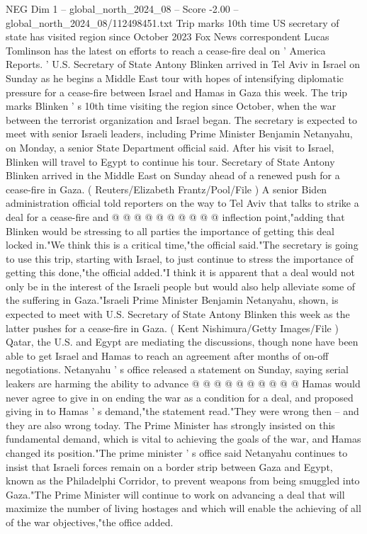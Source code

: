 \begin{textsample}{NEG Dim 1 – global\_north\_2024\_08 – Score -2.00 – global\_north\_2024\_08/112498451.txt}  \label{ex:f1_neg_039}
Trip marks 10th time US secretary of state has visited region since October 2023 Fox News correspondent Lucas Tomlinson has the latest on efforts to reach a cease-fire deal on ' America Reports. ' U.S.
Secretary of State Antony Blinken arrived in Tel Aviv in Israel on Sunday as he begins a Middle East tour with hopes of intensifying diplomatic pressure for a cease-fire between Israel and Hamas in Gaza this week.
The trip marks Blinken ' s 10th time visiting the region since October, when the war between the terrorist organization and Israel began.
The secretary is expected to meet with senior Israeli leaders, including Prime Minister Benjamin Netanyahu, on Monday, a senior State Department official said.
After his visit to Israel, Blinken will travel to Egypt to continue his tour.
Secretary of State Antony Blinken arrived in the Middle East on Sunday ahead of a renewed push for a cease-fire in Gaza. ( Reuters/Elizabeth Frantz/Pool/File ) A senior Biden administration official told reporters on the way to Tel Aviv that talks to strike a deal for a cease-fire and @ @ @ @ @ @ @ @ @ @ inflection point,"adding that Blinken would be stressing to all parties the importance of getting this deal locked in."We think this is a critical time,"the official said."The secretary is going to use this trip, starting with Israel, to just continue to stress the importance of getting this done,"the official added."I think it is apparent that a deal would not only be in the interest of the Israeli people but would also help alleviate some of the suffering in Gaza."Israeli Prime Minister Benjamin Netanyahu, shown, is expected to meet with U.S.
Secretary of State Antony Blinken this week as the latter pushes for a cease-fire in Gaza. ( Kent Nishimura/Getty Images/File ) Qatar, the U.S. and Egypt are mediating the discussions, though none have been able to get Israel and Hamas to reach an agreement after months of on-off negotiations.
Netanyahu ' s office released a statement on Sunday, saying serial leakers are harming the ability to advance @ @ @ @ @ @ @ @ @ @ Hamas would never agree to give in on ending the war as a condition for a deal, and proposed giving in to Hamas ' s demand,"the statement read."They were wrong then -- and they are also wrong today.
The Prime Minister has strongly insisted on this fundamental demand, which is vital to achieving the goals of the war, and Hamas changed its position."The prime minister ' s office said Netanyahu continues to insist that Israeli forces remain on a border strip between Gaza and Egypt, known as the Philadelphi Corridor, to prevent weapons from being smuggled into Gaza."The Prime Minister will continue to work on advancing a deal that will maximize the number of living hostages and which will enable the achieving of all of the war objectives,"the office added.

\end{textsample}

